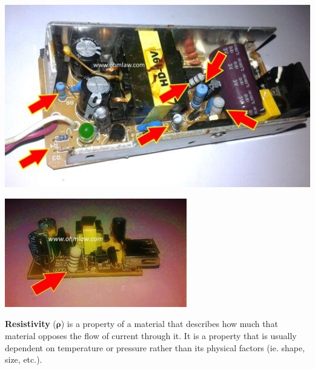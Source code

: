 \documentclass[12pt]{article}
\begin{document}
\vspace{1ex}
\begin{minipage}{.45\textwidth}
    \captionsetup{hypcap=false}
    \centering
    \includegraphics[width=\linewidth]{laptop-charger.jpg}
    \label{fig:laptop}
\end{minipage}
\hfill
\begin{minipage}{.45\textwidth}
    \captionsetup{hypcap=false}
    \centering
    \includegraphics[width=\linewidth]{mobile-phone-charger.jpg}
    \label{fig:phone}
\end{minipage}

\textbf{Resistivity} ($\mathbf{\rho}$) is a property of a material that describes how much that material opposes the flow of current through it. It is a property that
is usually dependent on temperature or pressure rather than its physical factors (ie. shape, size, etc.).
\end{document}
